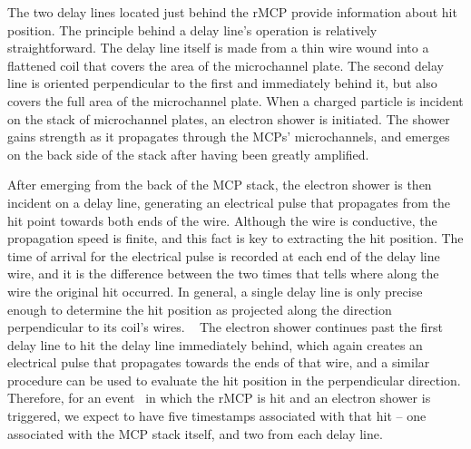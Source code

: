 The two delay lines located just behind the rMCP provide information about hit position.  The principle behind a delay line's operation is relatively straightforward.  The delay line itself is made from a thin wire wound into a flattened coil that covers the area of the microchannel plate.  The second delay line is oriented perpendicular to the first and immediately behind it, but also covers the full area of the microchannel plate.  When a charged particle is incident on the stack of microchannel plates, an electron shower is initiated.  The shower gains strength as it propagates through the MCPs' microchannels, and emerges on the back side of the stack after having been greatly amplified.  

After emerging from the back of the MCP stack, the electron shower is then incident on a delay line, generating an electrical pulse that propagates from the hit point towards both ends of the wire.  Although the wire is conductive, the propagation speed is finite, and this fact is key to extracting the hit position.  The time of arrival for the electrical pulse is recorded at each end of the delay line wire, and it is the difference between the two times that tells where along the wire the original hit occurred.  In general, a single delay line is only precise enough to determine the hit position as projected along the direction perpendicular to its coil's wires.
~ 
The electron shower continues past the first delay line to hit the delay line immediately behind, which again creates an electrical pulse that propagates towards the ends of that wire, and a similar procedure can be used to evaluate the hit position in the perpendicular direction.  Therefore, for an event~ in which the rMCP is hit and an electron shower is triggered, we expect to have five timestamps associated with that hit -- one associated with the MCP stack itself, and two from each delay line.

